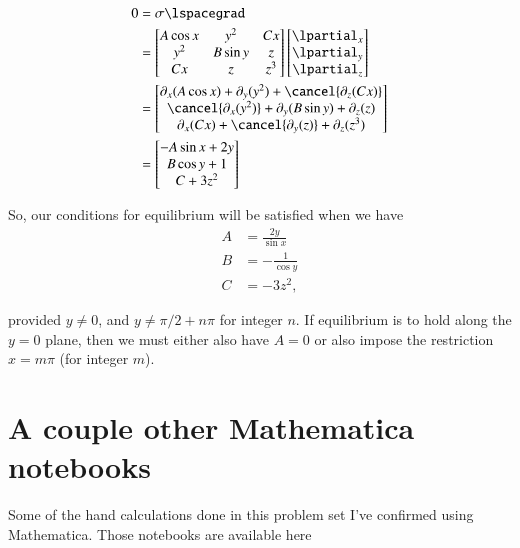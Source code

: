 \begin{align*}
0 
&= \sigma \lspacegrad \\
&=
\begin{bmatrix}
A \cos x & y^2 & C x \\
y^2 & B \sin y & z \\
C x & z & z^3
\end{bmatrix}
\begin{bmatrix}
\lpartial_x \\
\lpartial_y \\
\lpartial_z \\
\end{bmatrix} \\
&=
\begin{bmatrix}
\partial_x (A \cos x) + \partial_y(y^2) + \cancel{\partial_z(C x)} \\
\cancel{\partial_x (y^2)} + \partial_y(B \sin y) + \partial_z(z) \\
\partial_x (C x) + \cancel{\partial_y(z)} + \partial_z(z^3)
\end{bmatrix} \\
&=
\begin{bmatrix}
-A \sin x + 2 y \\
B \cos y + 1 \\
C + 3 z^2 
\end{bmatrix} \\
\end{align*}

So, our conditions for equilibrium will be satisfied when we have
\begin{align}\label{eqn:continuumProblemSet1:550}
A &= \frac{2 y }{\sin x} \\
B &= -\frac{1}{\cos y} \\
C &= -3 z^2,
\end{align}

provided $y \ne 0$, and $y \ne \pi/2 + n\pi$ for integer $n$.  If equilibrium is to hold along the $y = 0$ plane, then we must either also have $A = 0$ or also impose the restriction $x = m \pi$ (for integer $m$).

\section{A couple other Mathematica notebooks}

Some of the hand calculations done in this problem set I've confirmed using Mathematica.  Those notebooks are available here

